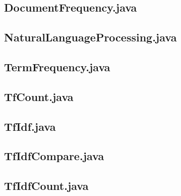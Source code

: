 \documentclass[a4paper,11pt]{ltjsarticle}
\begin{document}
\subsection*{DocumentFrequency.java}


\subsection*{NaturalLanguageProcessing.java}


\subsection*{TermFrequency.java}


\subsection*{TfCount.java}


\subsection*{TfIdf.java}


\subsection*{TfIdfCompare.java}


\subsection*{TfIdfCount.java}

\end{document}

